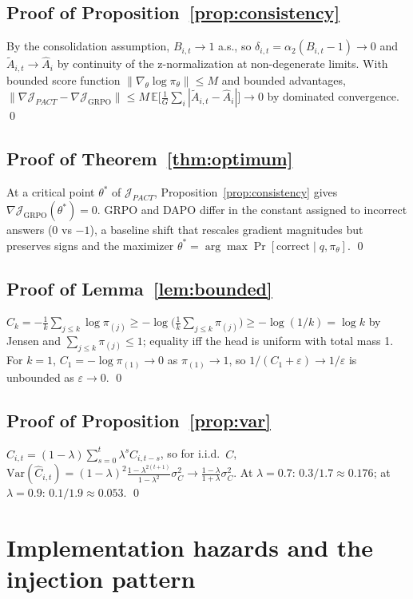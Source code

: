\documentclass{article} %
\theoremstyle{plain}
\theoremstyle{definition}
\theoremstyle{remark}
\newcommand{\method}{PACT}
\begin{document}
\subsection{Proof of Proposition~\ref{prop:consistency}}
By the consolidation assumption, $B_{i,t}\to1$ a.s., so $\delta_{i,t} = \alpha_2(B_{i,t}-1) \to 0$ and $\tilde A_{i,t} \to \hat A_i$ by continuity of the z-normalization at non-degenerate limits. With bounded score function $\|\nabla_\theta \log\pi_\theta\|\le M$ and bounded advantages, $\|\nabla\mathcal{J}_{\method} - \nabla\mathcal{J}_{\mathrm{GRPO}}\| \le M\,\mathbb{E}\big[\tfrac1G\sum_i |\tilde A_{i,t} - \hat A_i|\big] \to 0$ by dominated convergence. \qed

\subsection{Proof of Theorem~\ref{thm:optimum}}
At a critical point $\theta^*$ of $\mathcal{J}_{\method}$, Proposition~\ref{prop:consistency} gives $\nabla\mathcal{J}_{\mathrm{GRPO}}(\theta^*)=0$. GRPO and DAPO differ in the constant assigned to incorrect answers ($0$ vs $-1$), a baseline shift that rescales gradient magnitudes but preserves signs and the maximizer $\theta^*=\arg\max \Pr[\text{correct}\mid q,\pi_\theta]$. \qed

\subsection{Proof of Lemma~\ref{lem:bounded}}
$C_k = -\tfrac1k\sum_{j\le k}\log \pi_{(j)} \ge -\log\big(\tfrac1k\sum_{j\le k}\pi_{(j)}\big) \ge -\log(1/k) = \log k$ by Jensen and $\sum_{j\le k}\pi_{(j)}\le1$; equality iff the head is uniform with total mass 1. For $k=1$, $C_1 = -\log\pi_{(1)} \to 0$ as $\pi_{(1)}\to1$, so $1/(C_1+\varepsilon)\to1/\varepsilon$ is unbounded as $\varepsilon\to0$. \qed

\subsection{Proof of Proposition~\ref{prop:var}}
$\hat C_{i,t} = (1-\lambda)\sum_{s=0}^{t}\lambda^s C_{i,t-s}$, so for i.i.d.\ $C$, $\mathrm{Var}(\hat C_{i,t}) = (1-\lambda)^2 \tfrac{1-\lambda^{2(t+1)}}{1-\lambda^2}\sigma_C^2 \to \tfrac{1-\lambda}{1+\lambda}\sigma_C^2$. At $\lambda=0.7$: $0.3/1.7 \approx 0.176$; at $\lambda=0.9$: $0.1/1.9\approx0.053$. \qed

\section{Implementation hazards and the injection pattern}
\label{app:impl}
\end{document}
